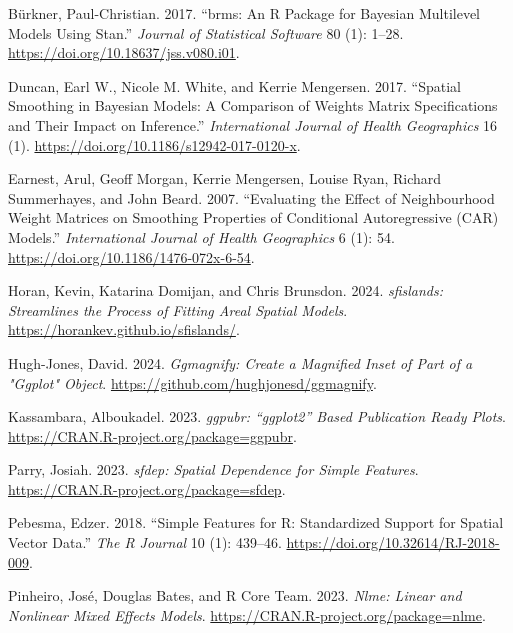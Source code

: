 \begin{CSLReferences}{1}{0}
\leavevmode{}%
Bürkner, Paul-Christian. 2017. {``{brms}: An {R} Package for {Bayesian} Multilevel Models Using {Stan}.''} \emph{Journal of Statistical Software} 80 (1): 1--28. \url{https://doi.org/10.18637/jss.v080.i01}.

\leavevmode{}%
Duncan, Earl W., Nicole M. White, and Kerrie Mengersen. 2017. {``Spatial Smoothing in Bayesian Models: A Comparison of Weights Matrix Specifications and Their Impact on Inference.''} \emph{International Journal of Health Geographics} 16 (1). \url{https://doi.org/10.1186/s12942-017-0120-x}.

\leavevmode{}%
Earnest, Arul, Geoff Morgan, Kerrie Mengersen, Louise Ryan, Richard Summerhayes, and John Beard. 2007. {``Evaluating the Effect of Neighbourhood Weight Matrices on Smoothing Properties of Conditional Autoregressive (CAR) Models.''} \emph{International Journal of Health Geographics} 6 (1): 54. \url{https://doi.org/10.1186/1476-072x-6-54}.

\leavevmode{}%
Horan, Kevin, Katarina Domijan, and Chris Brunsdon. 2024. \emph{{sfislands}: Streamlines the Process of Fitting Areal Spatial Models}. \url{https://horankev.github.io/sfislands/}.

\leavevmode{}%
Hugh-Jones, David. 2024. \emph{Ggmagnify: Create a Magnified Inset of Part of a "Ggplot" Object}. \url{https://github.com/hughjonesd/ggmagnify}.

\leavevmode{}%
Kassambara, Alboukadel. 2023. \emph{{ggpubr}: {``{ggplot2}''} Based Publication Ready Plots}. \url{https://CRAN.R-project.org/package=ggpubr}.

\leavevmode{}%
Parry, Josiah. 2023. \emph{{sfdep}: Spatial Dependence for Simple Features}. \url{https://CRAN.R-project.org/package=sfdep}.

\leavevmode{}%
Pebesma, Edzer. 2018. {``{Simple Features for R: Standardized Support for Spatial Vector Data}.''} \emph{{The R Journal}} 10 (1): 439--46. \url{https://doi.org/10.32614/RJ-2018-009}.

\leavevmode{}%
Pinheiro, José, Douglas Bates, and R Core Team. 2023. \emph{Nlme: Linear and Nonlinear Mixed Effects Models}. \url{https://CRAN.R-project.org/package=nlme}.


\end{CSLReferences}

